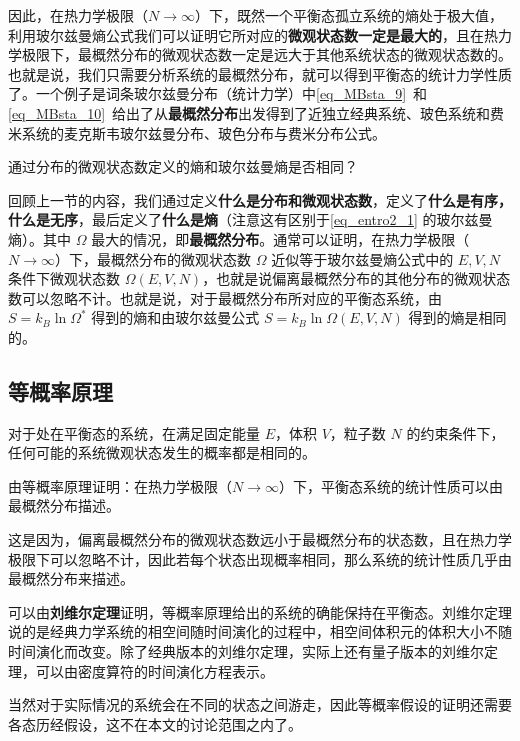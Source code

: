 因此，在热力学极限（$N\rightarrow \infty$）下，既然一个平衡态孤立系统的熵处于极大值，利用玻尔兹曼熵公式我们可以证明它所对应的\textbf{微观状态数一定是最大的}，且在热力学极限下，最概然分布的微观状态数一定是远大于其他系统状态的微观状态数的。也就是说，我们只需要分析系统的最概然分布，就可以得到平衡态的统计力学性质了。一个例子是词条玻尔兹曼分布（统计力学）中\autoref{eq_MBsta_9}~和\autoref{eq_MBsta_10}~给出了从\textbf{最概然分布}出发得到了近独立经典系统、玻色系统和费米系统的麦克斯韦玻尔兹曼分布、玻色分布与费米分布公式。
\begin{exercise}{}
通过分布的微观状态数定义的熵和玻尔兹曼熵是否相同？
\end{exercise}
回顾上一节的内容，我们通过定义\textbf{什么是分布和微观状态数}，定义了\textbf{什么是有序，什么是无序}，最后定义了\textbf{什么是熵}（注意这有区别于\autoref{eq_entro2_1} 的玻尔兹曼熵）。其中 $\Omega$ 最大的情况，即\textbf{最概然分布}。通常可以证明，在热力学极限（$N\rightarrow \infty$）下，最概然分布的微观状态数 $\Omega$ 近似等于玻尔兹曼熵公式中的 $E,V,N$ 条件下微观状态数 $\Omega(E,V,N)$，也就是说偏离最概然分布的其他分布的微观状态数可以忽略不计。也就是说，对于最概然分布所对应的平衡态系统，由 $S=k_B\ln \Omega^*$ 得到的熵和由玻尔兹曼公式 $S=k_B\ln \Omega(E,V,N)$ 得到的熵是相同的。

\subsection{等概率原理}
对于处在平衡态的系统，在满足固定能量 $E$，体积 $V$，粒子数 $N$ 的约束条件下，任何可能的系统微观状态发生的概率都是相同的。
\begin{exercise}{}
由等概率原理证明：在热力学极限（$N\rightarrow \infty$）下，平衡态系统的统计性质可以由最概然分布描述。
\end{exercise}
这是因为，偏离最概然分布的微观状态数远小于最概然分布的状态数，且在热力学极限下可以忽略不计，因此若每个状态出现概率相同，那么系统的统计性质几乎由最概然分布来描述。

可以由\textbf{刘维尔定理}证明，等概率原理给出的系统的确能保持在平衡态。刘维尔定理说的是经典力学系统的相空间随时间演化的过程中，相空间体积元的体积大小不随时间演化而改变。除了经典版本的刘维尔定理，实际上还有量子版本的刘维尔定理，可以由密度算符的时间演化方程表示。

当然对于实际情况的系统会在不同的状态之间游走，因此等概率假设的证明还需要各态历经假设，这不在本文的讨论范围之内了。
